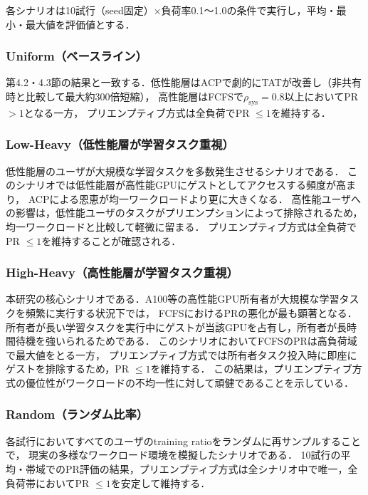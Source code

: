 \documentclass[12pt,a4paper]{jsarticle}
\begin{document}
各シナリオは10試行（seed固定）×負荷率0.1〜1.0の条件で実行し，平均・最小・最大値を評価値とする．

\subsubsection{Uniform（ベースライン）}

第4.2・4.3節の結果と一致する．低性能層はACPで劇的にTATが改善し（非共有時と比較して最大約300倍短縮），
高性能層はFCFSで$\rho_\mathrm{sys} = 0.8$以上においてPR $> 1$となる一方，
プリエンプティブ方式は全負荷でPR $\leq 1$を維持する．

\subsubsection{Low-Heavy（低性能層が学習タスク重視）}

低性能層のユーザが大規模な学習タスクを多数発生させるシナリオである．
このシナリオでは低性能層が高性能GPUにゲストとしてアクセスする頻度が高まり，
ACPによる恩恵が均一ワークロードより更に大きくなる．
高性能ユーザへの影響は，低性能ユーザのタスクがプリエンプションによって排除されるため，
均一ワークロードと比較して軽微に留まる．
プリエンプティブ方式は全負荷でPR $\leq 1$を維持することが確認される．

\subsubsection{High-Heavy（高性能層が学習タスク重視）}

本研究の核心シナリオである．A100等の高性能GPU所有者が大規模な学習タスクを頻繁に実行する状況下では，
FCFSにおけるPRの悪化が最も顕著となる．
所有者が長い学習タスクを実行中にゲストが当該GPUを占有し，所有者が長時間待機を強いられるためである．
このシナリオにおいてFCFSのPRは高負荷域で最大値をとる一方，
プリエンプティブ方式では所有者タスク投入時に即座にゲストを排除するため，PR $\leq 1$を維持する．
この結果は，プリエンプティブ方式の優位性がワークロードの不均一性に対して頑健であることを示している．

\subsubsection{Random（ランダム比率）}

各試行においてすべてのユーザのtraining ratioをランダムに再サンプルすることで，
現実の多様なワークロード環境を模擬したシナリオである．
10試行の平均・帯域でのPR評価の結果，プリエンプティブ方式は全シナリオ中で唯一，全負荷帯においてPR $\leq 1$を安定して維持する．
\end{document}
